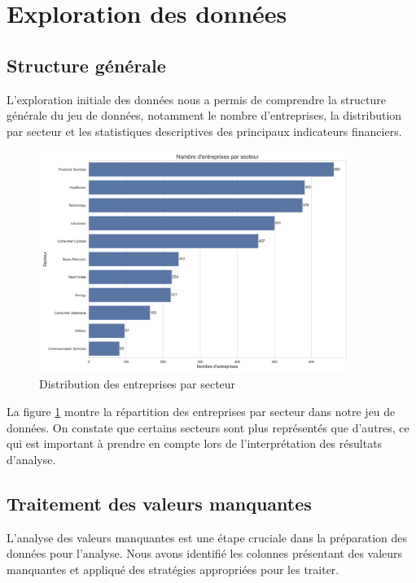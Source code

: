 \documentclass[11pt]{report}
\begin{document}
\section{Exploration des données}
\subsection{Structure générale}
L'exploration initiale des données nous a permis de comprendre la structure générale du jeu de données, notamment le nombre d'entreprises, la distribution par secteur et les statistiques descriptives des principaux indicateurs financiers.

\begin{figure}[H]
    \centering
    \includegraphics[width=0.9\textwidth]{figures/companies_by_sector.png}
    \caption{Distribution des entreprises par secteur}
    \label{fig:sector_distribution}
\end{figure}

La figure \ref{fig:sector_distribution} montre la répartition des entreprises par secteur dans notre jeu de données. On constate que certains secteurs sont plus représentés que d'autres, ce qui est important à prendre en compte lors de l'interprétation des résultats d'analyse.

\subsection{Traitement des valeurs manquantes}
L'analyse des valeurs manquantes est une étape cruciale dans la préparation des données pour l'analyse. Nous avons identifié les colonnes présentant des valeurs manquantes et appliqué des stratégies appropriées pour les traiter.
\end{document}
